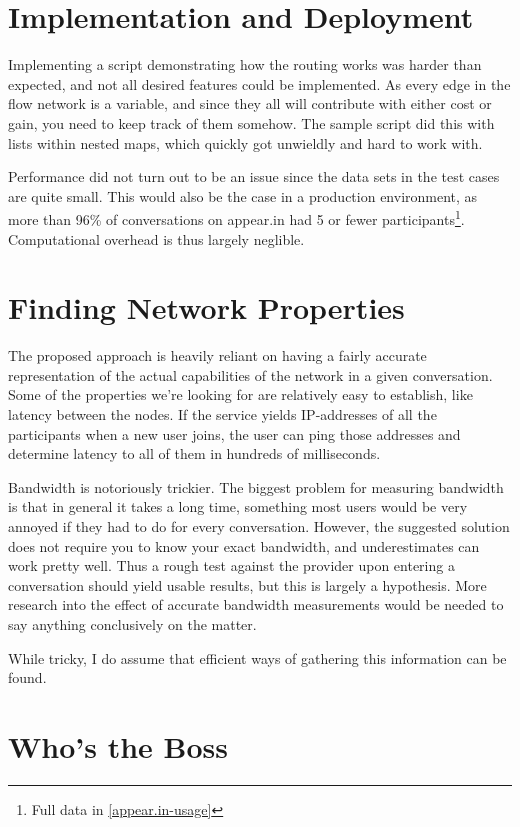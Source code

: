 \section{Implementation and Deployment}

Implementing a script demonstrating how the routing works was harder than expected, and not all desired features could be implemented. As every edge in the flow network is a variable, and since they all will contribute with either cost or gain, you need to keep track of them somehow. The sample script did this with lists within nested maps, which quickly got unwieldly and hard to work with.

Performance did not turn out to be an issue since the data sets in the test cases are quite small. This would also be the case in a production environment, as more than 96\% of conversations on appear.in had 5 or fewer participants\footnote{Full data in \autoref{appear.in-usage}}. Computational overhead is thus largely neglible.


\section{Finding Network Properties}

The proposed approach is heavily reliant on having a fairly accurate representation of the actual capabilities of the network in a given conversation. Some of the properties we're looking for are relatively easy to establish, like latency between the nodes. If the service yields IP-addresses of all the participants when a new user joins, the user can ping those addresses and determine latency to all of them in hundreds of milliseconds.

Bandwidth is notoriously trickier. The biggest problem for measuring bandwidth is that in general it takes a long time, something most users would be very annoyed if they had to do for every conversation. However, the suggested solution does not require you to know your exact bandwidth, and underestimates can work pretty well. Thus a rough test against the provider upon entering a conversation should yield usable results, but this is largely a hypothesis. More research into the effect of accurate bandwidth measurements would be needed to say anything conclusively on the matter.

While tricky, I do assume that efficient ways of gathering this information can be found.


\section{Who's the Boss}


